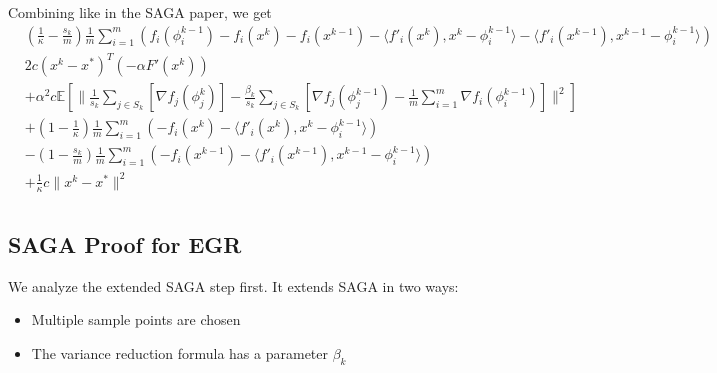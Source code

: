 \documentclass[11pt]{article}
\begin{document}
Combining like in the SAGA paper, we get 
\begin{align*}
& (\frac{1}{\kappa} -\frac{s_k}{m}) \frac{1}{m}\sum_{i =1}^{m} \left(  f_i(\phi_i^{k-1}) -   f_i(x^{k}) -  f_i(x^{k-1})- \langle f'_i(x^{k}), x^{k} -\phi_i^{k-1} \rangle  - \langle f'_i(x^{k-1}), x^{k-1} -\phi_i^{k-1} \rangle \right)  \\
  & 2 c(x^k - x^* )^T (- \alpha  F'(x^k)) \\
	&+ \alpha^2 c\mathbb{E} \left[  \|\frac{1}{s_k} \sum_{j \in S_k} \left[  \nabla f_j(\phi_j^{k}) \right]- \frac{ \beta_k }{s_k} \sum_{j \in S_k} \left[  \nabla f_j(\phi^{k-1}_j) - \frac{1}{m} \sum_{i = 1}^{m }  \nabla f_i (\phi_i^{k-1}) \right]  \|^2 \right] \\
  & +  \left(1-\frac{1}{\kappa} \right)\frac{1}{m}\sum_{i =1}^{m} \left( -   f_i(x^{k}) - \langle f'_i(x^{k}), x^{k} -\phi_i^{k-1} \rangle \right)\\
  & -  \left(1-\frac{s_k}{m} \right)\frac{1}{m}\sum_{i =1}^{m} \left(  -  f_i(x^{k-1})  - \langle f'_i(x^{k-1}), x^{k-1} -\phi_i^{k-1} \rangle \right)\\
  & +\frac{1}{\kappa} c \|x^{k} - x^* \|^2  \\
\end{align*}
\subsection{SAGA Proof for EGR}

We analyze the extended SAGA step first. It extends SAGA in two ways: 
\begin{itemize}
	\item Multiple sample points are chosen
	\item The variance reduction formula has a parameter $\beta_k$
\end{itemize}

\newpage 
\end{document}
